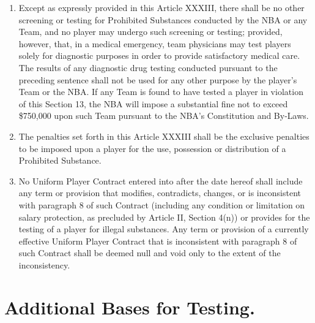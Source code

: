 \documentclass[
]{book}
\providecommand{\tightlist}{%
  \setlength{\itemsep}{0pt}\setlength{\parskip}{0pt}}
\begin{document}
\begin{enumerate}
\def\labelenumi{(\alph{enumi})}
\tightlist
\item
  Except as expressly provided in this Article XXXIII, there shall be no other screening or testing for Prohibited Substances conducted by the NBA or any Team, and no player may undergo such screening or testing; provided, however, that, in a medical emergency, team physicians may test players solely for diagnostic purposes in order to provide satisfactory medical care. The results of any diagnostic drug testing conducted pursuant to the preceding sentence shall not be used for any other purpose by the player's Team or the NBA. If any Team is found to have tested a player in violation of this Section 13, the NBA will impose a substantial fine not to exceed \$750,000 upon such Team pursuant to the NBA's Constitution and By-Laws.
\item
  The penalties set forth in this Article XXXIII shall be the exclusive penalties to be imposed upon a player for the use, possession or distribution of a Prohibited Substance.
\item
  No Uniform Player Contract entered into after the date hereof shall include any term or provision that modifies, contradicts, changes, or is inconsistent with paragraph 8 of such Contract (including any condition or limitation on salary protection, as precluded by Article II, Section 4(n)) or provides for the testing of a player for illegal substances. Any term or provision of a currently effective Uniform Player Contract that is inconsistent with paragraph 8 of such Contract shall be deemed null and void only to the extent of the inconsistency.
\end{enumerate}

\hypertarget{additional-bases-for-testing.}{%
\section{Additional Bases for Testing.}\label{additional-bases-for-testing.}}
\end{document}
